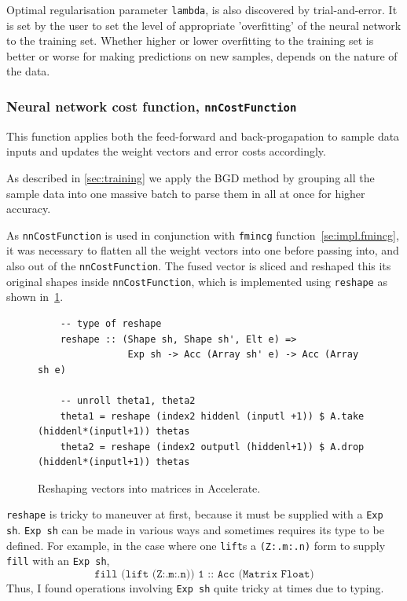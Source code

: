 Optimal regularisation parameter \texttt{lambda}, is also discovered by trial-and-error. It is set by the user to set the level of appropriate 'overfitting' of the neural network to the training set. Whether higher or lower overfitting to the training set is better or worse for making predictions on new samples, depends on the nature of the data. 

\subsubsection{Neural network cost function, \texttt{nnCostFunction}} \label{se:impl.nnCostFunction}

This function applies both the feed-forward and back-progapation to sample data inputs and updates the weight vectors and error costs accordingly. 

As described in \ref{sec:training} we apply the BGD method by grouping all the sample data into one massive batch to parse them in all at once for higher accuracy. 

As \texttt{nnCostFunction} is used in conjunction with \texttt{fmincg} function~\ref{se:impl.fmincg}, it was necessary to flatten all the weight vectors into one before passing into, and also out of the \texttt{nnCostFunction}. The fused vector is sliced and reshaped this its original shapes inside \texttt{nnCostFunction}, which is implemented using \texttt{reshape} as shown in~\ref{fig:reshape}.

\begin{figure}
	\begin{lstlisting}
	-- type of reshape
    reshape :: (Shape sh, Shape sh', Elt e) =>
                Exp sh -> Acc (Array sh' e) -> Acc (Array sh e)

    -- unroll theta1, theta2
    theta1 = reshape (index2 hiddenl (inputl +1)) $ A.take (hiddenl*(inputl+1)) thetas
    theta2 = reshape (index2 outputl (hiddenl+1)) $ A.drop (hiddenl*(inputl+1)) thetas
	\end{lstlisting}
  	\caption{Reshaping vectors into matrices in Accelerate.}
	\label{fig:reshape}
\end{figure}

\texttt{reshape} is tricky to maneuver at first, because it must be supplied with a \texttt{Exp sh}. \texttt{Exp sh} can be made in various ways and sometimes requires its type to be defined. For example, in the case where one \texttt{lift}s a \texttt{(Z:.m:.n)} form to supply \texttt{fill} with an \texttt{Exp sh},
$$\texttt{fill (lift (Z:.m:.n)) 1 :: Acc (Matrix Float)}$$
Thus, I found operations involving \texttt{Exp sh} quite tricky at times due to typing.

